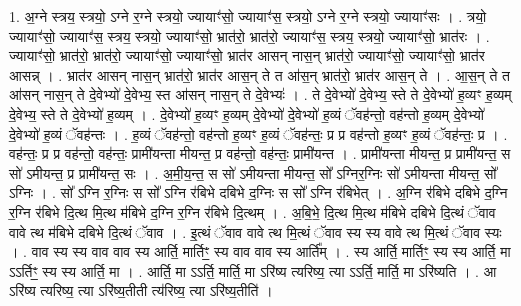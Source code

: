 \documentclass[17pt]{extarticle}
\begin{document}
1. अ॒ग्ने स्त्रय॒ स्त्रयो॒ ऽग्ने र॒ग्ने स्त्रयो॒ ज्यायाꣳ॑सो॒ ज्यायाꣳ॑स॒ स्त्रयो॒ ऽग्ने र॒ग्ने स्त्रयो॒ ज्यायाꣳ॑सः । . त्रयो॒ ज्यायाꣳ॑सो॒ ज्यायाꣳ॑स॒ स्त्रय॒ स्त्रयो॒ ज्यायाꣳ॑सो॒ भ्रात॑रो॒ भ्रात॑रो॒ ज्यायाꣳ॑स॒ स्त्रय॒ स्त्रयो॒ ज्यायाꣳ॑सो॒ भ्रात॑रः । . ज्यायाꣳ॑सो॒ भ्रात॑रो॒ भ्रात॑रो॒ ज्यायाꣳ॑सो॒ ज्यायाꣳ॑सो॒ भ्रात॑र आसन् नास॒न् भ्रात॑रो॒ ज्यायाꣳ॑सो॒ ज्यायाꣳ॑सो॒ भ्रात॑र आसन्न् । . भ्रात॑र आसन् नास॒न् भ्रात॑रो॒ भ्रात॑र आस॒न् ते त आ॑स॒न् भ्रात॑रो॒ भ्रात॑र आस॒न् ते । . आ॒स॒न् ते त आ॑सन् नास॒न् ते दे॒वेभ्यो॑ दे॒वेभ्य॒ स्त आ॑सन् नास॒न् ते दे॒वेभ्यः॑ । . ते दे॒वेभ्यो॑ दे॒वेभ्य॒ स्ते ते दे॒वेभ्यो॑ ह॒व्यꣳ ह॒व्यम् दे॒वेभ्य॒ स्ते ते दे॒वेभ्यो॑ ह॒व्यम् । . दे॒वेभ्यो॑ ह॒व्यꣳ ह॒व्यम् दे॒वेभ्यो॑ दे॒वेभ्यो॑ ह॒व्यं ॅवह॑न्तो॒ वह॑न्तो ह॒व्यम् दे॒वेभ्यो॑ दे॒वेभ्यो॑ ह॒व्यं ॅवह॑न्तः । . ह॒व्यं ॅवह॑न्तो॒ वह॑न्तो ह॒व्यꣳ ह॒व्यं ॅवह॑न्तः॒ प्र प्र वह॑न्तो ह॒व्यꣳ ह॒व्यं ॅवह॑न्तः॒ प्र । . वह॑न्तः॒ प्र प्र वह॑न्तो॒ वह॑न्तः॒ प्रामी॑यन्ता मीयन्त॒ प्र वह॑न्तो॒ वह॑न्तः॒ प्रामी॑यन्त । . प्रामी॑यन्ता मीयन्त॒ प्र प्रामी॑यन्त॒ स सो॑ ऽमीयन्त॒ प्र प्रामी॑यन्त॒ सः । . अ॒मी॒य॒न्त॒ स सो॑ ऽमीयन्ता मीयन्त॒ सो᳚ ऽग्निर॒ग्निः सो॑ ऽमीयन्ता मीयन्त॒ सो᳚ ऽग्निः । . सो᳚ ऽग्नि र॒ग्निः स सो᳚ ऽग्नि र॑बिभे दबिभे द॒ग्निः स सो᳚ ऽग्नि र॑बिभेत् । . अ॒ग्नि र॑बिभे दबिभे द॒ग्नि र॒ग्नि र॑बिभे दि॒त्थ मि॒त्थ म॑बिभे द॒ग्नि र॒ग्नि र॑बिभे दि॒त्थम् । . अ॒बि॒भे॒ दि॒त्थ मि॒त्थ म॑बिभे दबिभे दि॒त्थं ॅवाव वावे त्थ म॑बिभे दबिभे दि॒त्थं ॅवाव । . इ॒त्थं ॅवाव वावे त्थ मि॒त्थं ॅवाव स्य स्य वावे त्थ मि॒त्थं ॅवाव स्यः । . वाव स्य स्य वाव वाव स्य आर्ति॒ मार्तिꣳ॒॒ स्य वाव वाव स्य आर्ति᳚म् । . स्य आर्ति॒ मार्तिꣳ॒॒ स्य स्य आर्ति॒ मा ऽऽर्तिꣳ॒॒ स्य स्य आर्ति॒ मा । . आर्ति॒ मा ऽऽर्ति॒ मार्ति॒ मा ऽरि॑ष्य त्यरिष्य॒ त्या ऽऽर्ति॒ मार्ति॒ मा ऽरि॑ष्यति । . आ ऽरि॑ष्य त्यरिष्य॒ त्या ऽरि॑ष्य॒तीती त्य॑रिष्य॒ त्या ऽरि॑ष्य॒तीति॑ । \newline
\end{document}
